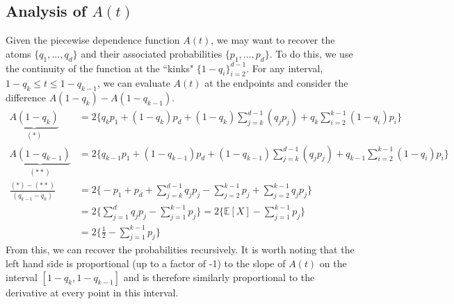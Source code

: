 \documentclass[12pt]{article}
\def\E{\mathbb{E}}
\newcommand{\ds}{\displaystyle}
\theoremstyle{definition}
\theoremstyle{definition}
\begin{document}
\subsection{Analysis of $A(t)$}
Given the piecewise dependence function $A(t)$, we may want to recover the atoms $\{q_1,\hdots,q_d\}$ and their associated probabilities $\{p_1,\hdots,p_d\}$. To do this, we use the continuity of the function at the ``kinks" $\ds \{1-q_i\}_{i=2}^{d-1}$. For any interval, $1-q_k\leq t\leq 1-q_{k-1}$, we can evaluate $A(t)$ at the endpoints and consider the difference $A(1-q_k)-A(1-q_{k-1})$.
\begin{align*}
    \underbrace{A(1-q_k)}_{(*)}&=2\bigg\{q_kp_1 + (1-q_k)p_d+ (1-q_k)\sum_{j=k}^{d-1}(q_jp_j)+q_k\sum_{i=2}^{k-1}(1-q_i)p_i\bigg\}\\
    \underbrace{A(1-q_{k-1})}_{(**)}&=2\bigg\{q_{k-1}p_1 + (1-q_{k-1})p_d+ (1-q_{k-1})\sum_{j=k}^{d-1}(q_jp_j)+q_{k-1}\sum_{i=2}^{k-1}(1-q_i)p_i\bigg\}\\
    \frac{(*)-(**)}{(q_{k-1}-q_k)}&=2\bigg\{-p_1+p_d +\sum_{j=k}^{d-1}q_jp_j -\sum_{j=2}^{k-1}p_j+\sum_{j=2}^{k-1}q_jp_j\bigg\}\\
    &=2\bigg\{ \sum_{j=1}^dq_jp_j -\sum_{j=1}^{k-1}p_j \bigg\}=2\bigg\{ \E[X]-\sum_{j=1}^{k-1}p_j\bigg\}\\
    &=2\bigg\{ \frac{1}{2}-\sum_{j=1}^{k-1}p_j \bigg\}
\end{align*}
From this, we can recover the probabilities recursively. It is worth noting that the left hand side is proportional (up to a factor of -1) to the slope of $A(t)$ on the interval $[1-q_k, 1-q _{k-1}]$ and is therefore similarly proportional to the derivative at every point in this interval.
\end{document}
